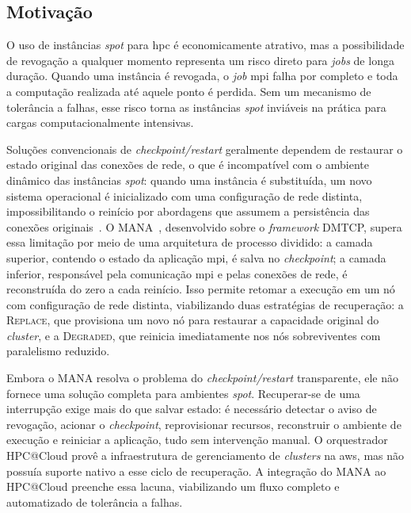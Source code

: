 \documentclass[a4paper,11pt]{article}
\begin{document}
        \subsection{Motivação}

            O uso de instâncias \textit{spot} para \gls{hpc} é economicamente atrativo, mas
            a possibilidade de revogação a qualquer momento representa um risco direto
            para \textit{jobs} de longa duração. Quando uma instância é revogada, o
            \textit{job} \gls{mpi} falha por completo e toda a computação realizada até aquele
            ponto é perdida. Sem um mecanismo de tolerância a falhas, esse risco torna
            as instâncias \textit{spot} inviáveis na prática para cargas
            computacionalmente intensivas.

            Soluções convencionais de \textit{checkpoint/restart} geralmente dependem de
            restaurar o estado original das conexões de rede, o que é incompatível com o
            ambiente dinâmico das instâncias \textit{spot}: quando uma instância é
            substituída, um novo sistema operacional é inicializado com uma configuração
            de rede distinta, impossibilitando o reinício por abordagens que assumem a
            persistência das conexões originais~\cite{hargrove2006blcr,ansel2009dmtcp}.
            O MANA~\cite{garg2019mana}, desenvolvido sobre o \textit{framework} DMTCP,
            supera essa limitação por meio de uma arquitetura de processo dividido: a
            camada superior, contendo o estado da aplicação \gls{mpi}, é salva no
            \textit{checkpoint}; a camada inferior, responsável pela comunicação \gls{mpi} e
            pelas conexões de rede, é reconstruída do zero a cada reinício. Isso permite
            retomar a execução em um nó com configuração de rede distinta, viabilizando
            duas estratégias de recuperação: a \textsc{Replace}, que provisiona um novo
            nó para restaurar a capacidade original do \textit{cluster}, e a
            \textsc{Degraded}, que reinicia imediatamente nos nós sobreviventes com
            paralelismo reduzido.

            Embora o MANA resolva o problema do \textit{checkpoint/restart} transparente,
            ele não fornece uma solução completa para ambientes \textit{spot}. Recuperar-se
            de uma interrupção exige mais do que salvar estado: é necessário detectar o
            aviso de revogação, acionar o \textit{checkpoint}, reprovisionar recursos,
            reconstruir o ambiente de execução e reiniciar a aplicação, tudo sem
            intervenção manual. O orquestrador HPC@Cloud provê a infraestrutura de
            gerenciamento de \textit{clusters} na \gls{aws}, mas não possuía suporte nativo a
            esse ciclo de recuperação. A integração do MANA ao HPC@Cloud preenche essa
            lacuna, viabilizando um fluxo completo e automatizado de tolerância a falhas.
\end{document}
